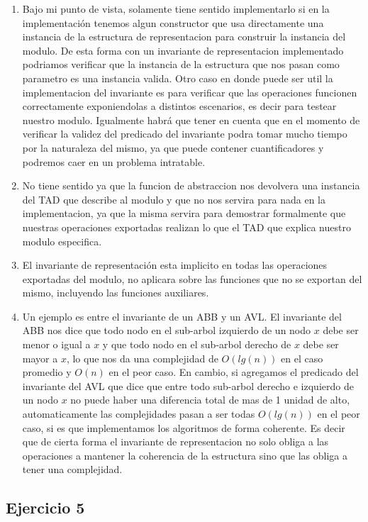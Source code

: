 \documentclass[10pt, a4paper]{article}
\begin{document}
\begin{enumerate}
 \item Bajo mi punto de vista, solamente tiene sentido implementarlo si en la implementaci\'on tenemos algun constructor que usa directamente una instancia de la estructura de representacion para construir la instancia del modulo. De esta forma con un invariante de representacion implementado podriamos verificar que la instancia de la estructura que nos pasan como parametro es una instancia valida. Otro caso en donde puede ser util la implementacion del invariante es para verificar que las operaciones funcionen correctamente exponiendolas a distintos escenarios, es decir para testear nuestro modulo. Igualmente habr\'a que tener en cuenta que en el momento de verificar la validez del predicado del invariante podra tomar mucho tiempo por la naturaleza del mismo, ya que puede contener cuantificadores y podremos caer en un problema intratable.
 \item No tiene sentido ya que la funcion de abstraccion nos devolvera una instancia del TAD que describe al modulo y que no nos servira para nada en la implementacion, ya que la misma servira para demostrar formalmente que nuestras operaciones exportadas realizan lo que el TAD que explica nuestro modulo especifica.
 \item El invariante de representaci\'on esta implicito en todas las operaciones exportadas del modulo, no aplicara sobre las funciones que no se exportan del mismo, incluyendo las funciones auxiliares.
 \item Un ejemplo es entre el invariante de un ABB y un AVL. El invariante del ABB nos dice que todo nodo en el sub-arbol izquierdo de un nodo $x$ debe ser menor o igual a $x$ y que todo nodo en el sub-arbol derecho de $x$ debe ser mayor a $x$, lo que nos da una complejidad de $O(lg(n))$ en el caso promedio y $O(n)$ en el peor caso. En cambio, si agregamos el predicado del invariante del AVL que dice que entre todo sub-arbol derecho e izquierdo de un nodo $x$ no puede haber una diferencia total de mas de 1 unidad de alto, automaticamente las complejidades pasan a ser todas $O(lg(n))$ en el peor caso, si es que implementamos los algoritmos de forma coherente. Es decir que de cierta forma el invariante de representacion no solo obliga a las operaciones a mantener la coherencia de la estructura sino que las obliga a tener una complejidad.
\end{enumerate}

\subsection*{Ejercicio 5}
\end{document}
